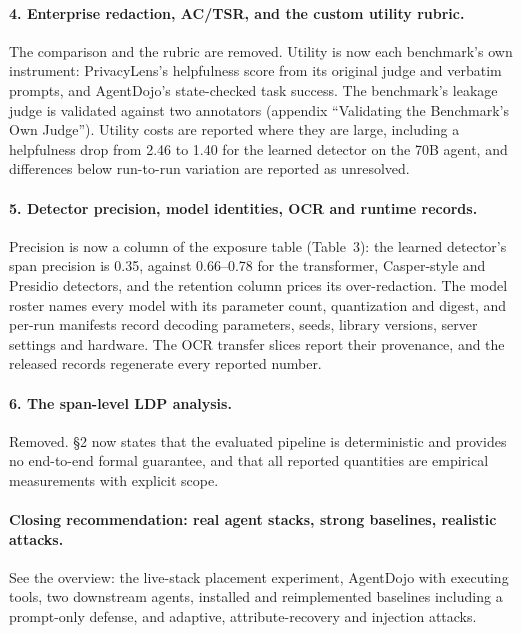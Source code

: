 \documentclass[10pt]{article}
\begin{document}
\paragraph{4. Enterprise redaction, AC/TSR, and the custom utility rubric.}
The comparison and the rubric are removed. Utility is now each benchmark's own instrument: PrivacyLens's
helpfulness score from its original judge and verbatim prompts, and AgentDojo's state-checked task success. The
benchmark's leakage judge is validated against two annotators (appendix ``Validating the Benchmark's Own
Judge''). Utility costs are reported where they are large, including a helpfulness drop from 2.46 to 1.40 for
the learned detector on the 70B agent, and differences below run-to-run variation are reported as unresolved.

\paragraph{5. Detector precision, model identities, OCR and runtime records.}
Precision is now a column of the exposure table (Table~3): the learned detector's span precision is 0.35,
against 0.66--0.78 for the transformer, Casper-style and Presidio detectors, and the retention column
prices its over-redaction. The model roster names every model with its parameter count, quantization and digest,
and per-run manifests record decoding parameters, seeds, library versions, server settings and hardware. The OCR
transfer slices report their provenance, and the released records regenerate every reported number.

\paragraph{6. The span-level LDP analysis.}
Removed. \S2 now states that the evaluated pipeline is deterministic and provides no end-to-end formal guarantee,
and that all reported quantities are empirical measurements with explicit scope.

\paragraph{Closing recommendation: real agent stacks, strong baselines, realistic attacks.}
See the overview: the live-stack placement experiment, AgentDojo with executing tools, two downstream agents,
installed and reimplemented baselines including a prompt-only defense, and adaptive, attribute-recovery and
injection attacks.
\end{document}
